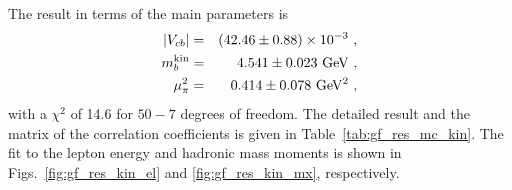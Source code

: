 The result in terms of the main parameters is
\begin{eqnarray}
  |V_{cb}| & = & (42.46\pm 0.88)\times 10^{-3}~, \\
  m_b^{\rm kin} & = & 4.541\pm 0.023~{\rm GeV}~, \\
  \mu^2_\pi & = & 0.414\pm 0.078~{\rm GeV^2}~,
\end{eqnarray}
with a $\chi^2$ of 14.6 for $50-7$ degrees of freedom. The detailed
result and the matrix of the correlation coefficients is given in
Table~\ref{tab:gf_res_mc_kin}. The fit to the lepton energy and
hadronic mass moments is shown in Figs.~\ref{fig:gf_res_kin_el} and
\ref{fig:gf_res_kin_mx}, respectively.
\begin{table}[!htb]
\caption{Fit result in the kinetic scheme, using a precise $c$-quark
  mass constraint. The error matrix of the fit contains
  experimental and theoretical contributions. In the lower part of the
  table, the correlation matrix of the parameters is
  given.} \label{tab:gf_res_mc_kin}
\begin{center}
\end{center}
\end{table}
